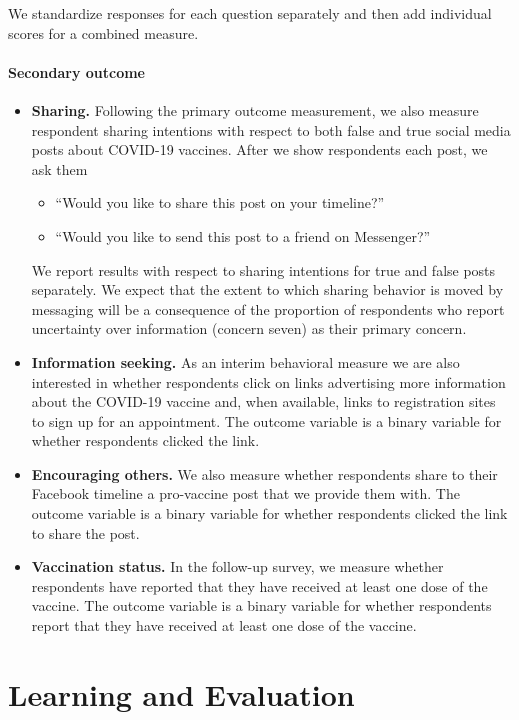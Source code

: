 \documentclass[letterpaper, 12pt, parskip=full,DIV=10]{scrartcl}
\begin{document}
We standardize responses for each question separately and then add individual scores for a combined measure. 

\paragraph{Secondary outcome}
\begin{itemize}
\item \textbf{Sharing.} Following the primary outcome measurement, we also measure respondent sharing intentions with respect to both false and true social media posts about COVID-19 vaccines. After we show respondents each post, we ask them 
\begin{itemize}[noitemsep, topsep=0pt]
  \item ``Would you like to share this post on your timeline?''
  \item ``Would you like to send this post to a friend on Messenger?''
\end{itemize}
We report results with respect to sharing intentions for true and false posts separately. We expect that the extent to which sharing behavior is moved by messaging will be a consequence of the proportion of respondents who report uncertainty over information (concern seven) as their primary concern. 
\item \textbf{Information seeking.} As an interim behavioral measure we are also interested in whether respondents click on links advertising more information about the COVID-19 vaccine and, when available, links to registration sites to sign up for an appointment. The outcome variable is a binary variable for whether respondents clicked the link. 
\item \textbf{Encouraging others.} We also measure whether respondents share to their Facebook timeline a pro-vaccine post that we provide them with. The outcome variable is a binary variable for whether respondents clicked the link to share the post. 
\item \textbf{Vaccination status.} In the follow-up survey, we measure whether respondents have reported that they have received at least one dose of the vaccine. The outcome variable is a binary variable for whether respondents report that they have received at least one dose of the vaccine. 
\end{itemize}

\section{Learning and Evaluation}
\end{document}
